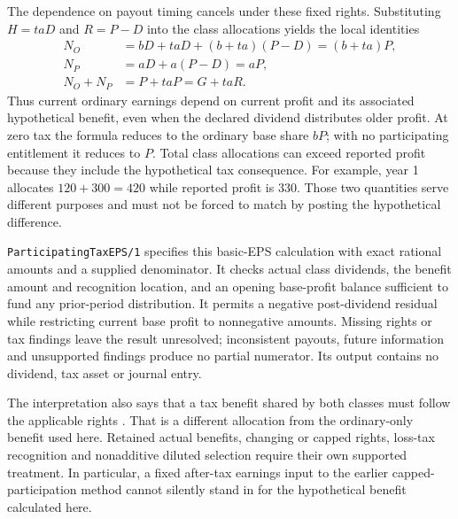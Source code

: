 The dependence on payout timing cancels under these fixed rights. Substituting
\(H=taD\) and \(R=P-D\) into the class allocations yields the local identities
\[
 \begin{aligned}
 N_O&=bD+taD+(b+ta)(P-D)=(b+ta)P,\\
 N_P&=aD+a(P-D)=aP,\\
 N_O+N_P&=P+taP=G+taR.
 \end{aligned}
\]
Thus current ordinary earnings depend on current profit and its associated
hypothetical benefit, even when the declared dividend distributes older profit.
At zero tax the formula reduces to the ordinary base share \(bP\); with no
participating entitlement it reduces to \(P\). Total class allocations can
exceed reported profit because they include the hypothetical tax consequence.
For example, year 1 allocates \(120+300=420\) while reported profit is 330.
Those two quantities serve different purposes and must not be forced to match
by posting the hypothetical difference.

\texttt{ParticipatingTaxEPS/1} specifies this basic-EPS calculation with exact
rational amounts and a supplied denominator. It checks actual class dividends,
the benefit amount and recognition location, and an opening base-profit balance
sufficient to fund any prior-period distribution. It permits a negative
post-dividend residual while restricting current base profit to nonnegative
amounts. Missing rights or tax findings leave the result unresolved;
inconsistent payouts, future information and unsupported findings produce no
partial numerator. Its output contains no dividend, tax asset or journal entry.

The interpretation also says that a tax benefit shared by both classes must
follow the applicable rights \citep[p.~2, footnote~(a)]{ifric2017participatingtaxexample}.
That is a different allocation from the ordinary-only benefit used here.
Retained actual benefits, changing or capped rights, loss-tax recognition and
nonadditive diluted selection require their own supported treatment. In
particular, a fixed after-tax earnings input to the earlier capped-participation
method cannot silently stand in for the hypothetical benefit calculated here.
